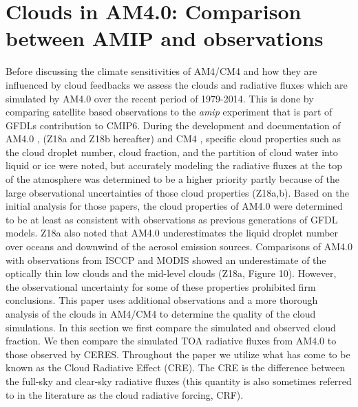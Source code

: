 \documentclass[draft]{agujournal2019}
\begin{document}
\section{Clouds in AM4.0: Comparison between AMIP and observations}



Before discussing the climate sensitivities of AM4/CM4 and how they are influenced by cloud feedbacks we assess
the clouds and radiative fluxes which are simulated by AM4.0 over the recent period of 1979-2014.  This is done 
by comparing satellite based observations to the \textit{amip} experiment that is part of GFDLs 
contribution to CMIP6.  
During the development and documentation of AM4.0 \cite{Zhao_etal_2018a, Zhao_etal_2018b}, 
(Z18a and Z18b hereafter) 
and CM4 \cite{Held_etal_2019}, specific cloud properties such as the 
cloud droplet number, cloud fraction, and the partition of cloud water into liquid or ice were noted, but 
accurately modeling the radiative fluxes at the top of the atmosphere was determined to be a 
higher priority partly because of the large observational uncertainties of those cloud properties (Z18a,b).   
Based on the initial analysis for those papers, the cloud properties of AM4.0 were determined to be
at least as consistent with observations as previous generations of GFDL models.  Z18a also noted 
that AM4.0 underestimates the liquid droplet number over oceans and downwind of the aerosol emission 
sources.   
Comparisons of AM4.0 with observations from ISCCP and MODIS showed an underestimate of 
the optically thin low clouds and the mid-level clouds (Z18a, Figure 10).  
However, the observational uncertainty for some of these properties prohibited firm conclusions.  This paper
uses additional observations and a more thorough analysis of the clouds in AM4/CM4 to determine 
the quality of the cloud simulations.        
In this section we first compare the simulated and observed cloud fraction.  We then compare  
the simulated TOA radiative fluxes from AM4.0 to those observed by CERES.    
Throughout the paper we utilize what has come to be known as the Cloud Radiative Effect (CRE).  The CRE is the 
difference between the full-sky and clear-sky radiative fluxes (this quantity is also sometimes referred
to in the literature as the cloud radiative forcing, CRF). 
\end{document}
